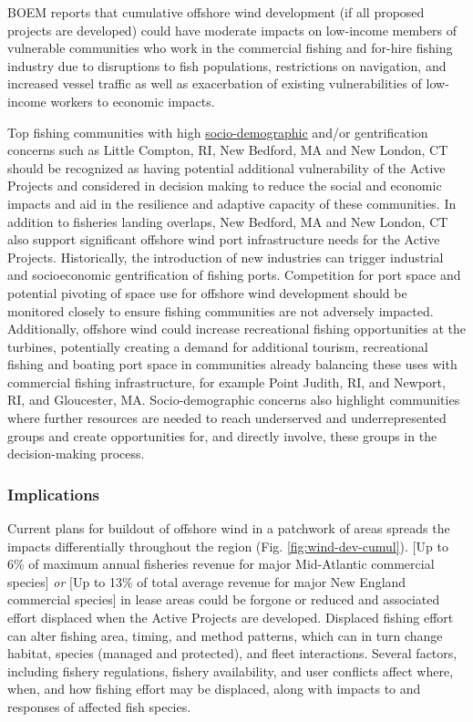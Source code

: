 \documentclass[
  10pt,
]{article}
\begin{document}
BOEM reports that cumulative offshore wind development (if all proposed projects are developed) could have moderate impacts on low-income members of vulnerable communities who work in the commercial fishing and for-hire fishing industry due to disruptions to fish populations, restrictions on navigation, and increased vessel traffic as well as exacerbation of existing vulnerabilities of low-income workers to economic impacts.

Top fishing communities with high \href{https://noaa-edab.github.io/catalog/engagement.html}{socio-demographic} and/or gentrification concerns such as Little Compton, RI, New Bedford, MA and New London, CT should be recognized as having potential additional vulnerability of the Active Projects and considered in decision making to reduce the social and economic impacts and aid in the resilience and adaptive capacity of these communities. In addition to fisheries landing overlaps, New Bedford, MA and New London, CT also support significant offshore wind port infrastructure needs for the Active Projects. Historically, the introduction of new industries can trigger industrial and socioeconomic gentrification of fishing ports. Competition for port space and potential pivoting of space use for offshore wind development should be monitored closely to ensure fishing communities are not adversely impacted. Additionally, offshore wind could increase recreational fishing opportunities at the turbines, potentially creating a demand for additional tourism, recreational fishing and boating port space in communities already balancing these uses with commercial fishing infrastructure, for example Point Judith, RI, and Newport, RI, and Gloucester, MA. Socio-demographic concerns also highlight communities where further resources are needed to reach underserved and underrepresented groups and create opportunities for, and directly involve, these groups in the decision-making process.

\subsubsection{Implications}\label{implications-11}

Current plans for buildout of offshore wind in a patchwork of areas spreads the impacts differentially throughout the region (Fig. \ref{fig:wind-dev-cumul}). {[}Up to 6\% of maximum annual fisheries revenue for major Mid-Atlantic commercial species{]} \emph{or} {[}Up to 13\% of total average revenue for major New England commercial species{]} in lease areas could be forgone or reduced and associated effort displaced when the Active Projects are developed. Displaced fishing effort can alter fishing area, timing, and method patterns, which can in turn change habitat, species (managed and protected), and fleet interactions. Several factors, including fishery regulations, fishery availability, and user conflicts affect where, when, and how fishing effort may be displaced, along with impacts to and responses of affected fish species.
\end{document}
